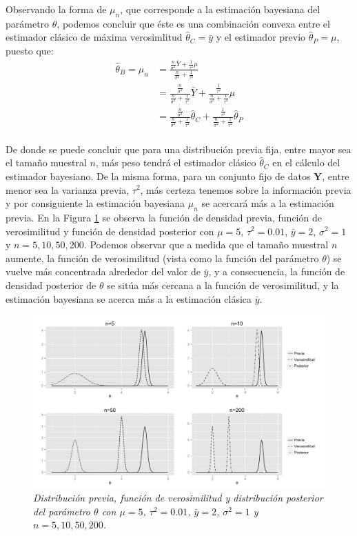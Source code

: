     Observando la forma de $\mu_n$, que corresponde a la estimaci\'on bayesiana del par\'ametro $\theta$, podemos concluir que \'este es una combinaci\'on convexa entre el estimador cl\'asico de m\'axima verosimlitud $\hat{\theta}_C=\bar{y}$ y el estimador previo $\hat{\theta}_P=\mu$, puesto que:
    \begin{align*}
    \hat{\theta}_B=\mu_n&=\frac{\frac{n}{\sigma^2}\bar{Y}+\frac{1}{\tau^2}\mu}{\frac{n}{\sigma^2}+\frac{1}{\tau^2}}\\
    &=\frac{\frac{n}{\sigma^2}}{\frac{n}{\sigma^2}+\frac{1}{\tau^2}}\bar{Y}+\frac{\frac{1}{\tau^2}}{\frac{n}{\sigma^2}+\frac{1}{\tau^2}}\mu\\
    &=\frac{\frac{n}{\sigma^2}}{\frac{n}{\sigma^2}+\frac{1}{\tau^2}}\hat{\theta}_C+\frac{\frac{1}{\tau^2}}{\frac{n}{\sigma^2}+\frac{1}{\tau^2}}\hat{\theta}_P\\
    \end{align*}
    
    De donde se puede concluir que para una distribuci\'on previa fija, entre mayor sea el tama\~no muestral $n$, m\'as peso tendr\'a el estimador cl\'asico $\hat{\theta}_C$ en el c\'alculo del estimador bayesiano. De la misma forma, para un conjunto fijo de datos $\mathbf{Y}$, entre menor sea la varianza previa, $\tau^2$, m\'as certeza tenemos sobre la informaci\'on previa y por consiguiente la estimaci\'on bayesiana $\mu_n$ se acercar\'a m\'as a la estimaci\'on previa. En la Figura \ref{compara_normal} se observa la funci\'on de densidad previa, funci\'on de verosimilitud y funci\'on de densidad posterior con $\mu=5$, $\tau^2=0.01$, $\bar{y}=2$, $\sigma^2=1$ y $n=5,10,50,200$. Podemos observar que a medida que el tama\~no muestral $n$ aumente, la funci\'on de verosimilitud (vista como la funci\'on del par\'ametro $\theta$) se vuelve m\'as concentrada alrededor del valor de $\bar{y}$, y a consecuencia, la funci\'on de densidad posterior de $\theta$ se sit\'ua m\'as cercana a la funci\'on de verosimilitud, y la estimaci\'on bayesiana se acerca m\'as a la estimaci\'on cl\'asica $\bar{y}$.
    
    \begin{figure}[!h]
    \centering
    \includegraphics[scale=0.57]{Comparacion_Normal.pdf}
    \caption{\emph{Distribuci\'on previa, funci\'on de verosimilitud y distribuci\'on posterior del par\'ametro $\theta$ con $\mu=5$, $\tau^2=0.01$, $\bar{y}=2$, $\sigma^2=1$ y $n=5,10,50,200$.}}
    \label{compara_normal}
    \end{figure}
    
